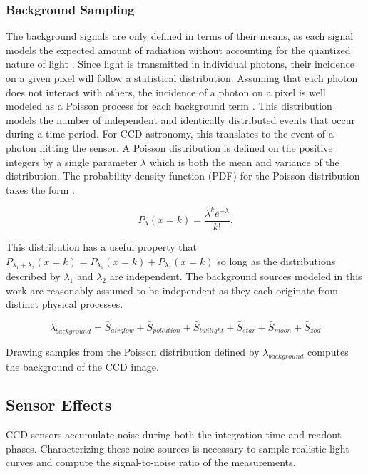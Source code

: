 \subsubsection{Background Sampling}

The background signals are only defined in terms of their means, as each signal models the expected amount of radiation without accounting for the quantized nature of light \cite{krag2003}. Since light is transmitted in individual photons, their incidence on a given pixel will follow a statistical distribution. Assuming that each photon does not interact with others, the incidence of a photon on a pixel is well modeled as a Poisson process for each background term \cite{frueh2019notes}. This distribution models the number of independent and identically distributed events that occur during a time period. For CCD astronomy, this translates to the event of a photon hitting the sensor. A Poisson distribution is defined on the positive integers by a single parameter $\lambda$ which is both the mean and variance of the distribution. The probability density function (PDF) for the Poisson distribution takes the form \cite{frueh2019notes}:

\begin{equation} \label{eq:poisson_pdf}
  P_\lambda(x=k) = \frac{\lambda^k e^{-\lambda}}{k!}.
\end{equation}

This distribution has a useful property that $P_{\lambda_1 + \lambda_2}(x=k) = P_{\lambda_1}(x=k) + P_{\lambda_2}(x=k)$ so long as the distributions described by $\lambda_1$ and $\lambda_2$ are independent. The background sources modeled in this work are reasonably assumed to be independent as they each originate from distinct physical processes.

\begin{equation} \label{eq:background_poisson}
  \lambda_{background} = \bar{S}_{airglow} + \bar{S}_{pollution} + \bar{S}_{twilight} + \bar{S}_{star} + \bar{S}_{moon} + \bar{S}_{zod}
\end{equation}

Drawing samples from the Poisson distribution defined by $\lambda_{background}$ computes the background of the CCD image. 

\subsection{Sensor Effects}

CCD sensors accumulate noise during both the integration time and readout phases. Characterizing these noise sources is necessary to sample realistic light curves and compute the signal-to-noise ratio of the measurements.

